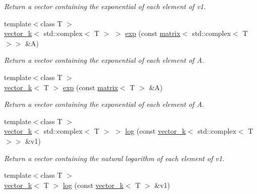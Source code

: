 \begin{DoxyCompactItemize}
\begin{DoxyCompactList}\small\item\em Return a vector containing the exponential of each element of v1. \end{DoxyCompactList}\item 
\hypertarget{namespacekeycpp_a71377e5dee3f47b001950fe0a1858722}{{\footnotesize template$<$class T $>$ }\\\hyperlink{classkeycpp_1_1vector__k}{vector\-\_\-k}$<$ std\-::complex$<$ T $>$ $>$ \hyperlink{namespacekeycpp_a71377e5dee3f47b001950fe0a1858722}{exp} (const \hyperlink{classkeycpp_1_1matrix}{matrix}$<$ std\-::complex$<$ T $>$$>$ \&A)}\label{namespacekeycpp_a71377e5dee3f47b001950fe0a1858722}

\begin{DoxyCompactList}\small\item\em Return a vector containing the exponential of each element of A. \end{DoxyCompactList}\item 
\hypertarget{namespacekeycpp_ad67d2e26dfbe947035bcfdceda54f957}{{\footnotesize template$<$class T $>$ }\\\hyperlink{classkeycpp_1_1vector__k}{vector\-\_\-k}$<$ T $>$ \hyperlink{namespacekeycpp_ad67d2e26dfbe947035bcfdceda54f957}{exp} (const \hyperlink{classkeycpp_1_1matrix}{matrix}$<$ T $>$ \&A)}\label{namespacekeycpp_ad67d2e26dfbe947035bcfdceda54f957}

\begin{DoxyCompactList}\small\item\em Return a vector containing the exponential of each element of A. \end{DoxyCompactList}\item 
\hypertarget{namespacekeycpp_a3f3de1f36299e80f237c0e9669b9ee1d}{{\footnotesize template$<$class T $>$ }\\\hyperlink{classkeycpp_1_1vector__k}{vector\-\_\-k}$<$ std\-::complex$<$ T $>$ $>$ \hyperlink{namespacekeycpp_a3f3de1f36299e80f237c0e9669b9ee1d}{log} (const \hyperlink{classkeycpp_1_1vector__k}{vector\-\_\-k}$<$ std\-::complex$<$ T $>$$>$ \&v1)}\label{namespacekeycpp_a3f3de1f36299e80f237c0e9669b9ee1d}

\begin{DoxyCompactList}\small\item\em Return a vector containing the natural logarithm of each element of v1. \end{DoxyCompactList}\item 
\hypertarget{namespacekeycpp_a1b4681da0aec9ca45280970b47fd55d6}{{\footnotesize template$<$class T $>$ }\\\hyperlink{classkeycpp_1_1vector__k}{vector\-\_\-k}$<$ T $>$ \hyperlink{namespacekeycpp_a1b4681da0aec9ca45280970b47fd55d6}{log} (const \hyperlink{classkeycpp_1_1vector__k}{vector\-\_\-k}$<$ T $>$ \&v1)}\label{namespacekeycpp_a1b4681da0aec9ca45280970b47fd55d6}


\end{DoxyCompactItemize}

